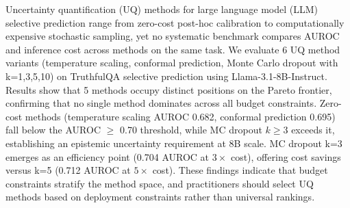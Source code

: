 
Uncertainty quantification (UQ) methods for large language model (LLM) selective prediction range from zero-cost post-hoc calibration to computationally expensive stochastic sampling, yet no systematic benchmark compares AUROC and inference cost across methods on the same task. We evaluate 6 UQ method variants (temperature scaling, conformal prediction, Monte Carlo dropout with k=1,3,5,10) on TruthfulQA selective prediction using Llama-3.1-8B-Instruct. Results show that 5 methods occupy distinct positions on the Pareto frontier, confirming that no single method dominates across all budget constraints. Zero-cost methods (temperature scaling AUROC 0.682, conformal prediction 0.695) fall below the AUROC $\geq$ 0.70 threshold, while MC dropout $k\geq 3$ exceeds it, establishing an epistemic uncertainty requirement at 8B scale. MC dropout k=3 emerges as an efficiency point (0.704 AUROC at $3\times$ cost), offering cost savings versus k=5 (0.712 AUROC at $5\times$ cost). These findings indicate that budget constraints stratify the method space, and practitioners should select UQ methods based on deployment constraints rather than universal rankings.
